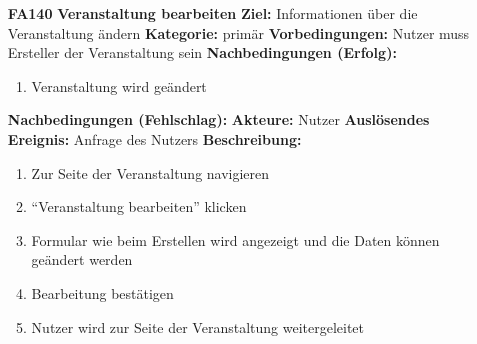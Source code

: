 \documentclass[parskip=full]{scrartcl}
\begin{document}
\begin{itemize}[nosep]
				
			\item[\textbf{FA140}]\textbf{Veranstaltung bearbeiten}
			\newline \textbf{Ziel:} Informationen über die Veranstaltung ändern
			\newline \textbf{Kategorie:} primär
			\newline \textbf{Vorbedingungen:} Nutzer muss Ersteller der Veranstaltung sein
			\newline \textbf{Nachbedingungen (Erfolg):} 
			\begin{enumerate}[nosep]
				\item Veranstaltung wird geändert 
			\end{enumerate}
			\textbf{Nachbedingungen (Fehlschlag):}
			\newline \textbf{Akteure:} Nutzer
			\newline \textbf{Auslösendes Ereignis:} Anfrage des Nutzers
			\newline \textbf{Beschreibung:}
			\begin{enumerate}[nosep]
				\item Zur Seite der Veranstaltung navigieren
				\item “Veranstaltung bearbeiten” klicken
				\item  Formular wie beim Erstellen wird angezeigt und die Daten können geändert werden
				\item Bearbeitung bestätigen
				\item Nutzer wird zur Seite der Veranstaltung weitergeleitet\\
			\end{enumerate}
				
								
			
				
						

\end{itemize}
\end{document}
